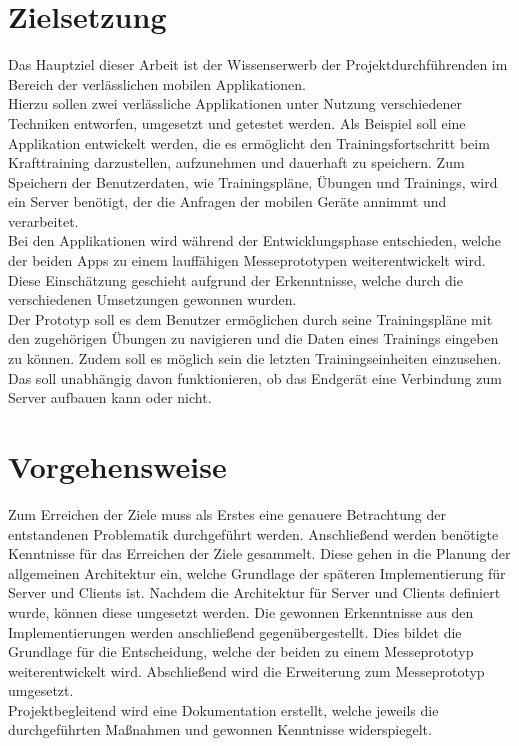 \section{Zielsetzung}
\label{sec:zielsetzung}
Das Hauptziel dieser Arbeit ist der Wissenserwerb der Projektdurchführenden im Bereich der verlässlichen mobilen Applikationen. \\
Hierzu sollen zwei verlässliche Applikationen unter Nutzung verschiedener Techniken entworfen, umgesetzt und getestet werden. Als Beispiel soll eine Applikation entwickelt werden, die es ermöglicht den Trainingsfortschritt beim Krafttraining darzustellen, aufzunehmen und dauerhaft zu speichern. Zum Speichern der Benutzerdaten, wie Trainingspläne, Übungen und Trainings, wird ein Server benötigt, der die Anfragen der mobilen Geräte annimmt und verarbeitet.\\
Bei den Applikationen wird während der Entwicklungsphase entschieden, welche der beiden \glspl{App} zu einem lauffähigen Messeprototypen weiterentwickelt wird. Diese Einschätzung geschieht aufgrund der Erkenntnisse, welche durch die verschiedenen Umsetzungen gewonnen wurden.\\
Der Prototyp soll es dem Benutzer ermöglichen durch seine Trainingspläne mit den zugehörigen Übungen zu navigieren und die Daten eines Trainings eingeben zu können. Zudem soll es möglich sein die letzten Trainingseinheiten einzusehen. Das soll unabhängig davon funktionieren, ob das Endgerät eine Verbindung zum Server aufbauen kann oder nicht.
\section{Vorgehensweise}
\label{sec:vorgehensweise}
Zum Erreichen der Ziele muss als Erstes eine genauere Betrachtung der entstandenen Problematik durchgeführt werden. Anschließend werden benötigte Kenntnisse für das Erreichen der Ziele gesammelt. Diese gehen in die Planung der allgemeinen Architektur ein, welche Grundlage der späteren Implementierung für Server und Clients ist. Nachdem die Architektur für Server und Clients definiert wurde, können diese umgesetzt werden. Die gewonnen Erkenntnisse aus den Implementierungen werden anschließend gegenübergestellt. Dies bildet die Grundlage für die Entscheidung, welche der beiden zu einem Messeprototyp weiterentwickelt wird. Abschließend wird die Erweiterung zum Messeprototyp umgesetzt.\\
Projektbegleitend wird eine Dokumentation erstellt, welche jeweils die durchgeführten Maßnahmen und gewonnen Kenntnisse widerspiegelt. 
